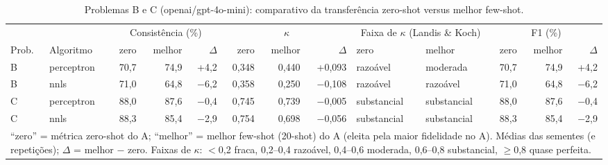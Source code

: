 \begin{table}[htbp]
\centering
\footnotesize
\caption{Problemas B e C (openai/gpt-4o-mini): comparativo da transferência zero-shot versus melhor few-shot.}
\label{tab:T9_comp_gpt4mini}
\begin{tabular}{llrrrrrrllrrr}
\toprule
 &  & \multicolumn{3}{c}{Consistência (\%)} & \multicolumn{3}{c}{$\kappa$} & \multicolumn{2}{c}{Faixa de $\kappa$ (Landis \& Koch)} & \multicolumn{3}{c}{F1 (\%)} \\ \cmidrule(lr){3-5} \cmidrule(lr){6-8} \cmidrule(lr){9-10} \cmidrule(lr){11-13}
Prob. & Algoritmo & zero & melhor & $\Delta$ & zero & melhor & $\Delta$ & zero & melhor & zero & melhor & $\Delta$ \\
\midrule
B & perceptron & 70,7 & 74,9 & +4,2 & 0,348 & 0,440 & +0,093 & razoável & moderada & 70,7 & 74,9 & +4,2 \\
B & nnls & 71,0 & 64,8 & $-$6,2 & 0,358 & 0,250 & $-$0,108 & razoável & razoável & 71,0 & 64,8 & $-$6,2 \\
\midrule
C & perceptron & 88,0 & 87,6 & $-$0,4 & 0,745 & 0,739 & $-$0,005 & substancial & substancial & 88,0 & 87,6 & $-$0,4 \\
C & nnls & 88,3 & 85,4 & $-$2,9 & 0,754 & 0,698 & $-$0,056 & substancial & substancial & 88,3 & 85,4 & $-$2,9 \\
\bottomrule
\multicolumn{13}{p{0.95\linewidth}}{\footnotesize ``zero'' = métrica zero-shot do A; ``melhor'' = melhor few-shot (20-shot) do A (eleita pela maior fidelidade no A). Médias das sementes (e repetições); $\Delta$ = melhor $-$ zero. Faixas de $\kappa$: $<$0,2 fraca, 0,2–0,4 razoável, 0,4–0,6 moderada, 0,6–0,8 substancial, $\geq$0,8 quase perfeita.} \\
\end{tabular}
\end{table}
